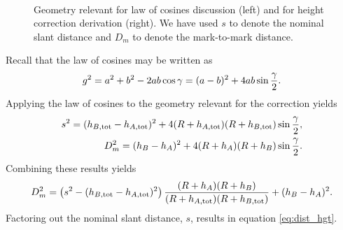 \begin{figure}[!htbp]
\centering
{}~~~~~~~~~~
\caption{Geometry relevant for law of cosines discussion (left) and for height correction derivation (right).  We have used $s$ to denote the nominal slant distance and $D_m$ to denote the mark-to-mark distance.}
\label{Fig:triangles}
\end{figure}
Recall that the law of cosines may be written as
\begin{equation}
g^2=a^2+b^2-2ab\cos\gamma = (a-b)^2+4ab\sin\frac{\gamma}{2}.
\end{equation}
Applying the law of cosines to the geometry relevant for the correction yields
\begin{eqnarray}
s^2 = (h_{B,\text{tot}}-h_{A,\text{tot}})^2+4(R+h_{A,\text{tot}})(R+h_{B,\text{tot}})\sin\frac{\gamma}{2},\\
D_m^2 = (h_{B}-h_{A})^2+4(R+h_{A})(R+h_{B})\sin\frac{\gamma}{2}.
\end{eqnarray}
Combining these results yields
\begin{equation}
D_m^2 = \left(s^2-(h_{B,\text{tot}}-h_{A,\text{tot}})^2\right)\frac{(R+h_A)(R+h_B)}{(R+h_{A,\text{tot}})(R+h_{B,\text{tot}})}+(h_B-h_A)^2.
\end{equation}
Factoring out the nominal slant distance, $s$, results in equation \eqref{eq:dist_hgt}.
